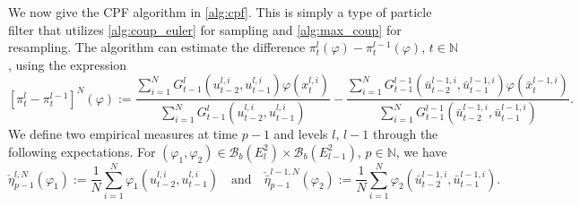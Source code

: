\documentclass[english]{article}
\begin{document}
We now give the CPF algorithm in \autoref{alg:cpf}. 
This is simply a type of particle filter that utilizes \autoref{alg:coup_euler} for sampling and \autoref{alg:max_coup} for resampling.
The algorithm can estimate the difference
$\pi_t^l(\varphi)-\pi_t^{l-1}(\varphi)$, $t\in \mathbb{N}$, using the expression
\begin{equation}\label{eq:cpf_est}
[\pi_t^l-\pi_t^{l-1}]^N(\varphi) := 
\frac{\sum_{i=1}^N G_{t-1}^l(u_{t-2}^{l,i},u_{t-1}^{l,i})\varphi(x_t^{l,i})}{\sum_{i=1}^N G_{t-1}^{l}(u_{t-2}^{l,i},u_{t-1}^{l,i})} -
\frac{\sum_{i=1}^N G_{t-1}^{l-1}(\bar{u}_{t-2}^{l-1,i},\bar{u}_{t-1}^{l-1,i})\varphi(\bar{x}_t^{l-1,i})}{\sum_{i=1}^N G_{t-1}^{l-1}(\bar{u}_{t-2}^{l-1,i},\bar{u}_{t-1}^{l-1,i})}.
\end{equation}
We define two empirical measures at time $p-1$ and levels $l$, $l-1$ through the following expectations. For $(\varphi_1,\varphi_2)\in\mathcal{B}_b(E_l^2)\times\mathcal{B}_b(E_{l-1}^2)$, $p\in\mathbb{N}$, we have
\begin{equation}\label{eq:pred_cpf}
\check{\eta}_{p-1}^{l,N}(\varphi_1) := \frac{1}{N}\sum_{i=1}^N\varphi_1(u_{t-2}^{l,i},u_{t-1}^{l,i})\quad\textrm{and}\quad
\check{\bar{\eta}}_{p-1}^{l-1,N}(\varphi_2) := \frac{1}{N}\sum_{i=1}^N\varphi_2(\bar{u}_{t-2}^{l-1,i},\bar{u}_{t-1}^{l-1,i}).
\end{equation}
\end{document}
